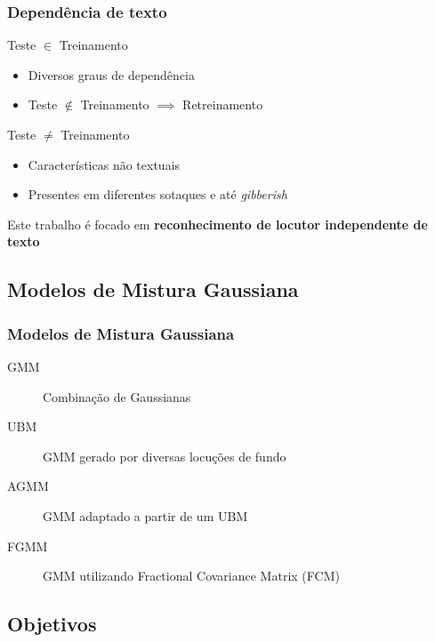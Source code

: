 \begin{frame}
\frametitle{Dependência de texto}
\begin{description}
    \item[Dependente] Teste $\in$ Treinamento
    \pause
    \begin{itemize}
        \item Diversos graus de dependência
        \pause
        \item Teste $\not\in$ Treinamento $\implies$ Retreinamento
        \pause
    \end{itemize}
    \item[Independente] Teste $\neq$ Treinamento
    \pause
    \begin{itemize}
        \item Características não textuais
        \pause
        \item Presentes em diferentes sotaques e até \emph{gibberish}
    \end{itemize}
    \pause
    \item Este trabalho é focado em \textbf{reconhecimento de locutor independente de texto}
\end{description}
\end{frame}

\subsection{Modelos de Mistura Gaussiana}

\begin{frame}
\frametitle{Modelos de Mistura Gaussiana}
\begin{description}
    \item[GMM] Combinação de Gaussianas
    \pause
    \item[UBM] GMM gerado por diversas locuções de fundo
    \pause
    \item[AGMM] GMM adaptado a partir de um UBM
    \pause
    \item[FGMM] GMM utilizando Fractional Covariance Matrix (FCM)
\end{description}
\end{frame}

\subsection{Objetivos}

